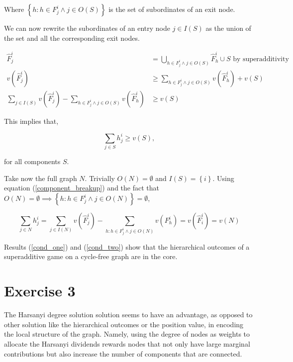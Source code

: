 \documentclass[american]{scrartcl}
\newcommand{\set}[1]{\left\{#1\right\}}
\begin{document}
Where $\set{h: h \in F_j^i \land j \in O(S)}$ is the set of subordinates of an exit node.

We can now rewrite the subordinates of an entry node $j \in I(S)$ as the union of the set and all the corresponding exit nodes.

\begin{equation}
    \begin{split}
        \hat{F}^i_j &= \bigcup_{h \in F_j^i \land j \in O(S)} \hat{F}^i_h \cup S \text{ by superadditivity } \\
        v\left( \hat{F}^i_j \right) &\geq \sum_{h \in F_j^i \land j \in O(S)} v( \hat{F}^i_h) + v(S) \\
        \sum_{j \in I(S)} v(\hat{F}_j^i) - \sum_{h \in F_j^i \land j \in O(S)} v( \hat{F}^i_h) &\geq v(S)
    \end{split}
\end{equation}

This implies that,

\begin{equation} \label{cond_one}
    \sum_{j \in S} h_j^i \geq v(S),
\end{equation}

for all components $S$.

Take now the full graph $N$. Trivially $O(N) = \emptyset$ and $I(S) = \set{i}$. Using equation (\ref{component_breakup}) and the fact that $O(N) = \emptyset \implies \set{h: h \in F_j^i \land j \in O(N)} = \emptyset$,

\begin{equation} \label{cond_two}
    \sum_{j \in N} h^i_j = \sum_{j \in I(N)} v(\hat{F}_j^i) - \sum_{h: h \in F_j^i \land j \in O(N)} v(F^i_h) = v(\hat{F}_i^i) = v(N)
\end{equation}

Results (\ref{cond_one}) and (\ref{cond_two}) show that the hierarchical outcomes of a superadditive game on a cycle-free graph are in the core.

\section*{Exercise 3}

The Harsanyi degree solution solution seems to have an advantage, as opposed to other solution like the hierarchical outcomes or the position value, in encoding the local structure of the graph. Namely, using the degree of nodes as weights to allocate the Harsanyi dividends rewards nodes that not only have large marginal contributions but also increase the number of components that are connected.
\end{document}

